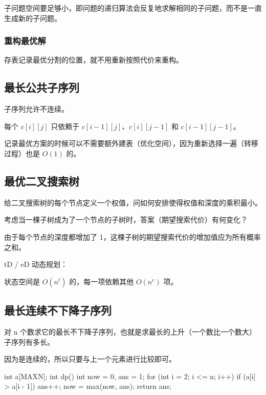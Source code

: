 子问题空间要足够小，即问题的递归算法会反复地求解相同的子问题，而不是一直生成新的子问题。

\subsubsection{重构最优解}

存表记录最优分割的位置，就不用重新按照代价来重构。

\subsection{最长公共子序列}

子序列允许不连续。

每个 $c[i][j]$ 只依赖于 $c[i - 1][j]$、$c[i][j - 1]$ 和 $c[i - 1][j - 1]$。

记录最优方案的时候可以不需要额外建表（优化空间），因为重新选择一遍（转移过程）也是 $O(1)$ 的。

\subsection{最优二叉搜索树}

给二叉搜索树的每个节点定义一个权值，问如何安排使得权值和深度的乘积最小。

考虑当一棵子树成为了一个节点的子树时，答案（期望搜索代价）有何变化？

由于每个节点的深度都增加了 1，这棵子树的期望搜索代价的增加值应为所有概率之和。

\begin{QUOTE}{}{}
tD / eD 动态规划：



状态空间是 $O(n^t)$ 的，每一项依赖其他 $O(n^e)$ 项。
\end{QUOTE}

\subsection{最长连续不下降子序列}

对 n 个数求它的最长不下降子序列，也就是求最长的上升（一个数比一个数大）子序列有多长。

因为是连续的，所以只要与上一个元素进行比较即可。

\begin{cppcode}
int a[MAXN];
int dp() {
  int now = 0, ans = 1;
  for (int i = 2; i <= n; i++) {
    if (a[i] > a[i - 1]) ans++;
    now = max(now, ans);
  }
  return ans;
}
\end{cppcode}

